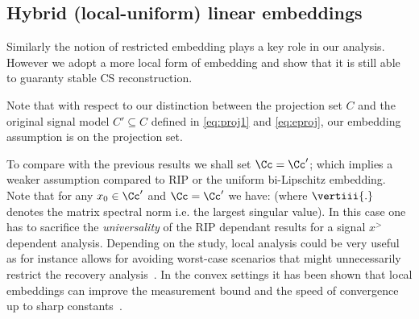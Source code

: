 \subsection{Hybrid (local-uniform) linear embeddings}
Similarly the notion of restricted embedding plays a key role in our analysis. However we adopt a more local form of embedding and show that it is still able to guaranty stable CS reconstruction.  

{}
\newline
	
 Note that with respect to our distinction between the projection set $C$ and the original signal model $C'\subseteq C$ defined in \eqref{eq:proj1} and \eqref{eq:eproj}, our embedding assumption is on the projection set.
 
To compare with the previous results we shall set $\Cc=\Cc'$; which implies a weaker assumption compared to RIP or the uniform bi-Lipschitz embedding. Note that for any $x_0\in\Cc'$ and $\Cc=\Cc'$ we have:  
(where $\vertiii{.}$ denotes the matrix spectral norm i.e. the largest singular value). 
In this case one has to sacrifice the \emph{universality} of the RIP dependant results for a signal $x^\gt$ dependent analysis. Depending on the study, local analysis could be very useful as for instance allows for avoiding worst-case scenarios that might unnecessarily restrict the recovery analysis~\cite{me:modelselecion}. In the convex settings it has been shown that local embeddings can improve the measurement bound and the speed of convergence up to sharp constants~\cite{recht:GW, Oymak:tradeoff}. 


